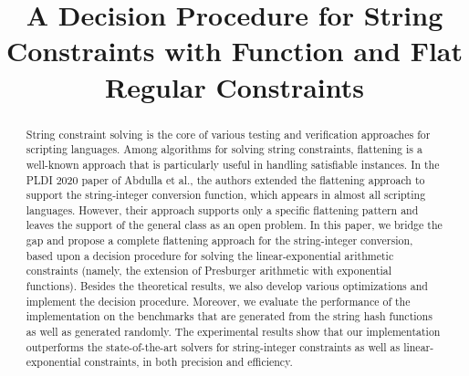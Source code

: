 \documentclass[runningheads]{llncs}
\title{A Decision Procedure for String Constraints with {\parseInt} Function and Flat Regular Constraints}
\author{ }
\institute{ }
\newcommand{\parseInt}{\textsf{parseInt}}
\begin{document}
\maketitle{}

\begin{abstract}
    String constraint solving is the core of various testing and verification approaches for scripting languages. 
    Among algorithms for solving string constraints, flattening is a well-known approach that is particularly useful in handling satisfiable instances.
    In the PLDI 2020 paper of Abdulla et al., the authors extended the flattening approach to support the string-integer conversion function, which appears in almost all scripting languages.
    However, their approach supports only a specific flattening pattern and leaves the support of the general class as an open problem.
    In this paper, we bridge the gap and propose a complete flattening approach for the string-integer conversion, based upon a decision procedure for solving the linear-exponential arithmetic constraints (namely, the extension of Presburger arithmetic with exponential functions).
    Besides the theoretical results, we also develop various optimizations and implement the decision procedure.
    Moreover, we evaluate the performance of the implementation on the benchmarks that are generated from the string hash functions as well as generated randomly.
    The experimental results show that our implementation outperforms the state-of-the-art solvers for string-integer constraints as well as linear-exponential constraints, in both precision and efficiency.

\end{abstract}

\iffalse     
    A Decision Procedure for String Constraints with the {\parseInt} Function and Flat Regular Constraints

    {\parseInt} converts strings to integers and is an important function in string manipulating programs. 
    Solving string constraints with {\parseInt} is challenging and undecidable in general. 
    The state-of-the-art string solvers resort to heuristics to solve such constraints. 
    In this work, we propose a decision procedure for a class of string constraints which 
    are boolean combinations of word equations, flat regular constraints, and {\parseInt} function. 
    The decision procedure is obtained by reducing the satisfiability problem to that of
    an extension of Presburger arithmetic with exponential functions, which is decidable. 
    We implement the decision procedure and carry out experiments to evaluate the performance. 
    The experimental results show the improvement against the state-of-the-art string solvers 
    in both precision and performance. To the best of our knowledge, this work represents the 
    first decision procedure for a class of string constraints with {\parseInt} function.
\fi 
\end{document}
